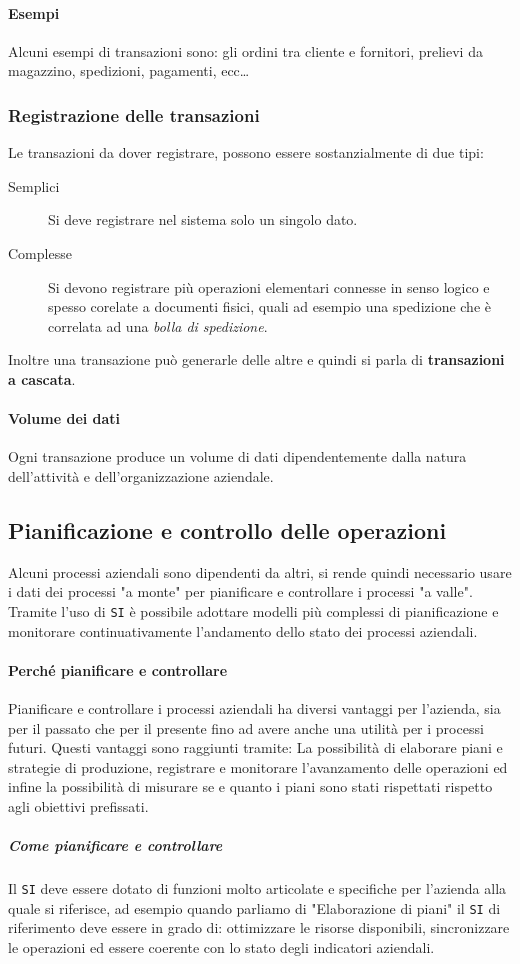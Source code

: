             \paragraph{Esempi} Alcuni esempi di transazioni sono: gli ordini tra cliente e fornitori, prelievi da magazzino, spedizioni, pagamenti, ecc\dots
        \subsubsection{Registrazione delle transazioni}
            Le transazioni da dover registrare, possono essere sostanzialmente di due tipi:
            \begin{description}
                \item[Semplici] Si deve registrare nel sistema solo un singolo dato.
                \item[Complesse] Si devono registrare più operazioni elementari connesse in senso logico e spesso corelate a documenti fisici, quali ad esempio una spedizione che è correlata ad una \textit{bolla di spedizione}.
            \end{description}
            Inoltre una transazione può generarle delle altre e quindi si parla di \textbf{transazioni a cascata}.
            \paragraph{Volume dei dati} Ogni transazione produce un volume di dati dipendentemente dalla natura dell'attività e dell'organizzazione aziendale.
    \subsection{Pianificazione e controllo delle operazioni}
        Alcuni processi aziendali sono dipendenti da altri, si rende quindi necessario usare i dati dei processi "a monte" per pianificare e controllare i processi "a valle". Tramite l'uso di \texttt{SI} è possibile adottare modelli più complessi di pianificazione e monitorare continuativamente l'andamento dello stato dei processi aziendali. 
        \paragraph{Perché pianificare e controllare} Pianificare e controllare i processi aziendali ha diversi vantaggi per l'azienda, sia per il passato che per il presente fino ad avere anche una utilità per i processi futuri. Questi vantaggi sono raggiunti tramite: La possibilità di elaborare piani e strategie di produzione, registrare e monitorare l'avanzamento delle operazioni ed infine la possibilità di misurare se e quanto i piani sono stati rispettati rispetto agli obiettivi prefissati.
            \subparagraph{Come pianificare e controllare} Il \texttt{SI} deve essere dotato di funzioni molto articolate e specifiche per l'azienda alla quale si riferisce, ad esempio quando parliamo di "Elaborazione di piani" il \texttt{SI} di riferimento deve essere in grado di: ottimizzare le risorse disponibili, sincronizzare le operazioni ed essere coerente con lo stato degli indicatori aziendali.
